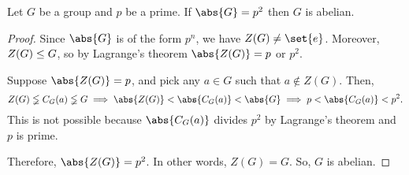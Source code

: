\documentclass[11pt]{penrose}
\begin{document}
\begin{ncor}
    Let $G$ be a group and $p$ be a prime. If $\abs{G} = p^{2}$ then $G$ is abelian.
\end{ncor}
\begin{proof}
    Since $\abs{G}$ is of the form $p^{n}$, we have $Z(G) \neq \set{e}$. Moreover, $Z(G) \mathrel{\leq} G$, so by Lagrange's theorem $\abs{Z(G)} = p$ or $p^{2}$.

    Suppose $\abs{Z(G)} = p$, and pick any $a \in G$ such that $a \notin Z(G)$. Then,
    \begin{equation*}
        Z(G) \lneqq C_{G}(a) \lneqq G
        \implies
        \abs{Z(G)} < \abs{C_{G}(a)} < \abs{G}
        \implies
        p < \abs{C_{G}(a)} < p^{2}.
    \end{equation*}
    This is not possible because $\abs{C_{G}(a)}$ divides $p^{2}$ by Lagrange's theorem and $p$ is prime.

    Therefore, $\abs{Z(G)} = p^{2}$. In other words, $Z(G) = G$. So, $G$ is abelian.
\end{proof}
\end{document}

